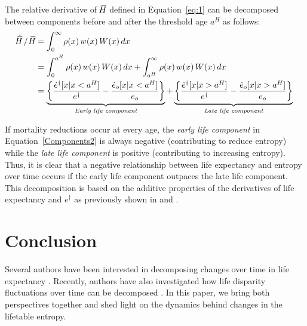 \documentclass[a4paper,twoside, openright, 12pt, leqno]{article}
\newcommand*\xbar[1]{%
   \hbox{%
     \vbox{%
       \hrule height 0.5pt %
       \kern0.3ex%
       \hbox{%
         \kern-0.28em%
         \ensuremath{#1}%
         \kern-0.05em%
       }%
     }%
   }%
}
\begin{document}
The relative derivative of $\,\xbar{H}$ defined in Equation~\eqref{eq:1} can be decomposed between components before and after the threshold age $a^H$ as follows:
%
\begin{equation}
 \begin{split}
 \dot{\xbar{H}}\,/\,\,\xbar{H} &= \int_0^\infty\rho(x)\,w(x)\,W(x)\,dx\;\\
  & = \int_0^{a^H} \rho(x)\,w(x)\,W(x)\,dx + \int_{a^H}^\infty\rho(x)\,w(x)\,W(x)\,dx		 \\
		& = \underbrace{ \left\lbrace \frac{\dot{e}^\dagger[x|x < a^H]}{e^\dagger}- \frac{\dot{e}_o[x|x < a^H]}{e_o}  \right\rbrace }_{\textit{Early life component}} + \underbrace{\left\lbrace \frac{\dot{e}^\dagger[x|x > a^H]}{e^\dagger}-\frac{\dot{e}_o[x|x > a^H]}{e_o} \right\rbrace }_{\textit{Late life component}}
 \end{split}
 \label{Components2}
\end{equation}

If mortality reductions occur at every age, the \textit{early life component} in Equation~\eqref{Components2} is always negative (contributing to reduce entropy) while the \textit{late life component} is positive (contributing to increasing entropy). Thus, it is clear that a negative relationship between life expectancy and entropy over time occurs if the early life component outpaces the late life component. This decomposition is based on the additive properties of the derivatives of life expectancy and $e^\dagger$ as previously shown in \citet{Vaupel2003} and \citet{Fernandez2015}. 



\section{Conclusion}
 Several authors have been interested in decomposing changes over time in life expectancy \citep{arriaga1984measuring, Vaupel1986, pollard1988decomposition, Vaupel2003, beltran2008integrated, beltran2011unifying}. Recently, authors have also investigated how life disparity fluctuations over time can be decomposed \citep{Wagner2010, Zhang2009, Shkolnikov2011, Aburto2018Eastern, aburto2019upsurge}. In this paper, we bring both perspectives together and shed light on the dynamics behind changes in the lifetable entropy.
   
\end{document}
